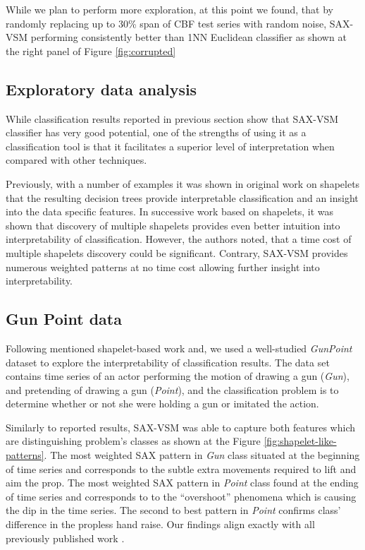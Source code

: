 \documentclass{llncs}
\begin{document}
While we plan to perform more exploration, at this point we found, that by randomly replacing up
to 30\% span of CBF test series with random noise, SAX-VSM performing consistently better
than 1NN Euclidean classifier as shown at the right panel of Figure \ref{fig:corrupted}

\subsection{Exploratory data analysis}
While classification results reported in previous section show that SAX-VSM classifier
has very good potential, one of the strengths of using it as a classification tool is that
it facilitates a superior level of interpretation when compared with other techniques. 

Previously, with a number of examples it was shown in original work on shapelets \cite{shapelet}
that the resulting decision trees provide interpretable classification and an insight into the data
specific features. In successive work \cite{bagnal} based on shapelets, it was shown that
discovery of multiple shapelets provides even better intuition into interpretability of
classification. However, the authors noted, that a time cost of multiple shapelets discovery
could be significant. Contrary, SAX-VSM provides numerous weighted patterns at no time cost
allowing further insight into interpretability.

\subsection{Gun Point data}
Following mentioned shapelet-based work \cite{shapelet} and\cite{bagnal}, we used a well-studied
\textit{GunPoint} dataset to explore the interpretability of classification results.
The data set contains time series of an actor performing the motion of drawing a gun
(\textit{Gun}), and pretending of drawing a gun (\textit{Point}), and the classification problem is
to determine whether or not she were holding a gun or imitated the action.

Similarly to reported results, SAX-VSM was able to capture both features which are distinguishing
problem's classes as shown at the Figure \ref{fig:shapelet-like-patterns}. The most weighted SAX
pattern in \textit{Gun} class situated at the beginning of time series and corresponds to the subtle
extra movements required to lift and aim the prop. 
The most weighted SAX pattern in \textit{Point} class found at the ending of time series and
corresponds to to the ``overshoot'' phenomena which is causing the dip in the time
series. 
The second to best pattern in \textit{Point} confirms class' difference in the propless hand
raise. 
Our findings align exactly with all previously published work \cite{shapelet} \cite{bagnal}.
\end{document}
